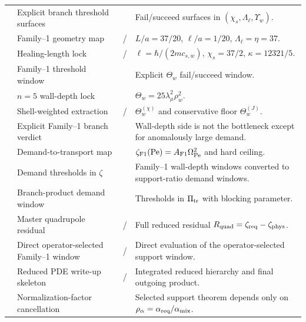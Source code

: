 \begin{longtable}{@{}L{0.09\textwidth}L{0.30\textwidth}L{0.20\textwidth}L{0.35\textwidth}@{}}
 & Explicit branch threshold surfaces & \StatusExactClosure{} & Fail/succeed surfaces in \((\chi_s,\Lambda_\ell,\Upsilon_w)\). \\
 & Family--1 geometry map & \StatusReduced{} / \StatusExactClosure{} & \(L/a=37/20\), \(\ell/a=1/20\), \(\Lambda_\ell=\eta=37\). \\
 & Healing-length lock & \StatusReduced{} / \StatusExactClosure{} & \(\ell=\hbar/(2mc_{s,w})\), \(\chi_s=37/2\), \(\kappa=12321/5\). \\
 & Family--1 threshold window & \StatusExactClosure{} & Explicit \(\Theta_w\) fail/succeed window. \\
 & \(n=5\) wall-depth lock & \StatusExactClosure{} & \(\Theta_w=25\lambda_\mu^2\rho_w^2\). \\
 & Shell-weighted extraction & \StatusReduced{} / \StatusNumerical{} & \(\Theta_w^{(\chi)}\) and conservative floor \(\Theta_w^{(J)}\). \\
 & Explicit Family--1 branch verdict & \StatusExactClosure{} & Wall-depth side is not the bottleneck except for anomalously large demand. \\
 & Demand-to-transport map & \StatusExactClosure{} & \(\zeta_{\rm F1}(\mathrm{Pe})=A_{\rm F1}\Omega_{\rm Pe}^2\) and hard ceiling. \\
 & Demand thresholds in \(\zeta\) & \StatusExactClosure{} & Family--1 wall-depth windows converted to support-ratio demand windows. \\
 & Branch-product demand window & \StatusExactClosure{} & Thresholds in \(\Pi_{\rm tr}\) with blocking parameter. \\
 & Master quadrupole residual & \StatusExactClosure{} / \StatusOpen{} & Full reduced residual \(R_{\rm quad}=\zeta_{\rm req}-\zeta_{\rm phys}\). \\
 & Direct operator-selected Family--1 window & \StatusExactClosure{} / \StatusNumerical{} & Direct evaluation of the operator-selected support window. \\
 & Reduced PDE write-up skeleton & \StatusExactClosure{} / \StatusOpen{} & Integrated reduced hierarchy and final outgoing product. \\
 & Normalization-factor cancellation & \StatusExactClosure{} & Selected support theorem depends only on \(\rho_\alpha=\alpha_{\rm req}/\alpha_{\rm mix}\). \\

\end{longtable}
